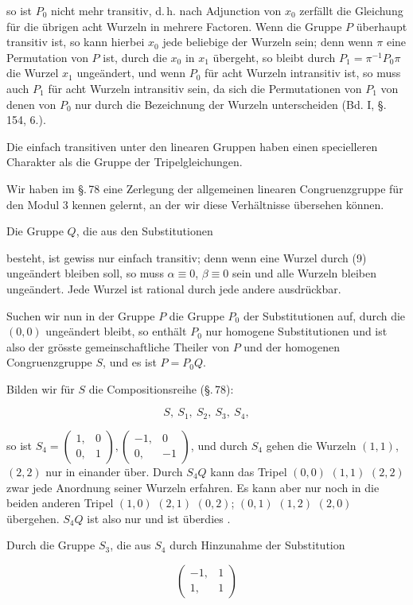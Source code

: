 so ist $P_0$ nicht mehr transitiv, d.\,h. nach Adjunction von $x_0$
zerfällt die Gleichung für die übrigen acht Wurzeln in mehrere Factoren. Wenn die
Gruppe $P$ überhaupt transitiv ist, so kann hierbei $x_0$ jede beliebige der Wurzeln
sein; denn wenn $\pi$ eine Permutation von $P$ ist, durch die $x_0$ in $x_1$ übergeht,
so bleibt durch $P_1 = \pi^{-1} P_0 \pi$ die Wurzel $x_1$ ungeändert, und wenn $P_0$
für acht Wurzeln intransitiv ist, so muss auch $P_1$ für acht Wurzeln intransitiv sein,
da sich die Permutationen von $P_1$ von denen von $P_0$ nur durch die Bezeichnung der
Wurzeln unterscheiden (Bd. I, §.\,154, 6.).

Die einfach transitiven unter den linearen Gruppen haben einen specielleren Charakter
als die Gruppe der Tripelgleichungen.

Wir haben im §.\,78 eine Zerlegung der allgemeinen linearen Congruenzgruppe für den
Modul 3 kennen gelernt, an der wir diese Verhältnisse übersehen können.

Die  Gruppe $Q$, die aus den Substitutionen


besteht, ist gewiss nur einfach transitiv; denn wenn eine Wurzel durch (9) ungeändert
bleiben soll, so muss $\alpha \equiv 0$, $\beta \equiv 0$ sein und alle Wurzeln bleiben
ungeändert. Jede Wurzel ist rational durch jede andere ausdrückbar.

Suchen wir nun in der Gruppe $P$ die Gruppe $P_0$ der Substitutionen auf, durch die
$(0,0)$ ungeändert bleibt, so enthält $P_0$ nur homogene Substitutionen und ist also
der grösste gemeinschaftliche Theiler von $P$ und der homogenen Congruenzgruppe $S$,
und es ist $P = P_0 Q$.

Bilden wir für $S$ die Compositionsreihe (§.\,78):

\[
S,\ S_1,\ S_2,\ S_3,\ S_4,
\]

so ist $S_4 = \begin{pmatrix} 1, & 0 \\ 0, & 1 \end{pmatrix}, \begin{pmatrix} -1, & 0 \\ 0, & -1 \end{pmatrix}$,
und durch $S_4$ gehen die Wurzeln $(1,1)$, $(2,2)$ nur in einander über. Durch $S_4 Q$
kann das Tripel $(0,0)$ $(1,1)$ $(2,2)$ zwar jede Anordnung seiner Wurzeln erfahren.
Es kann aber nur noch in die beiden anderen Tripel $(1,0)$ $(2,1)$ $(0,2)$;
$(0,1)$ $(1,2)$ $(2,0)$ übergehen. $S_4 Q$ ist also nur  und
ist überdies .

Durch die Gruppe $S_3$, die aus $S_4$ durch Hinzunahme der
Substitution

\[
\begin{pmatrix} -1, & 1 \\ 1, & 1 \end{pmatrix}
\]

